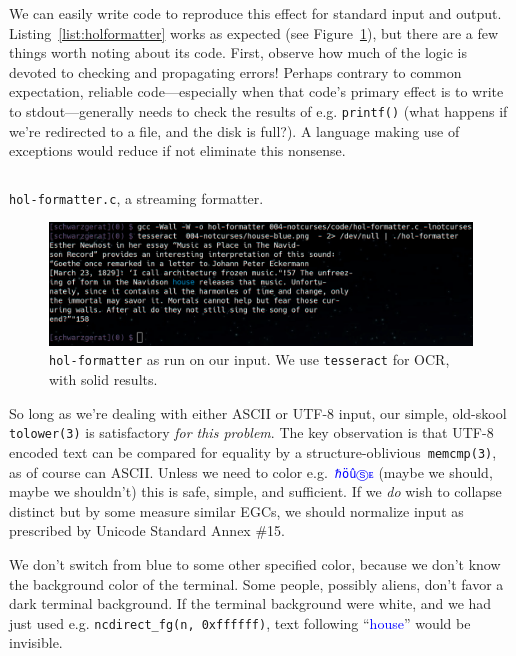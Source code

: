 \documentclass[letterpaper,10pt]{article}
\begin{document}
We can easily write code to reproduce this effect for standard input and output.
Listing~\ref{list:holformatter} works as expected (see
Figure~\ref{fig:houseout}), but there are a few things worth noting about its
code. First, observe how much of the logic is devoted to checking and
propagating errors! Perhaps contrary to common expectation, reliable
code---especially when that code's primary effect is to write to
stdout---generally needs to check the results of e.g. \texttt{printf()} (what
happens if we're redirected to a file, and the disk is full?). A language
making use of exceptions would reduce if not eliminate this nonsense.

\begin{listing}[!htbp]
\inputminted[]{C}{code/hol-formatter.c}
\caption{\texttt{hol-formatter.c}, a streaming formatter.}
\label{list:holformatter}
\end{listing}

\begin{figure}[!htbp]
\centering \includegraphics[width=.75\linewidth]{hol-formatted.png}
\caption[\texttt{hol-formatter} as run on OCRd input.]{\texttt{hol-formatter} as run on our input. We use \texttt{tesseract} for OCR, with solid results.}
\label{fig:houseout}
\end{figure}

So long as we're dealing with either ASCII or UTF-8 input, our simple, old-skool
\texttt{tolower(3)} is satisfactory \textit{for this problem}. The key
observation is that UTF-8 encoded text can be compared for equality by
a structure-oblivious~\texttt{memcmp(3)}, as of course can ASCII.
Unless we need to color e.g.~\textcolor{blue}{\texttt{ℏöûⓈᴇ}} (maybe we should,
maybe we shouldn't) this is safe, simple, and sufficient. If we \textit{do}
wish to collapse distinct but by some measure similar EGCs, we should normalize
input as prescribed by Unicode Standard Annex \#15\cite{annex15}.

We don't switch from blue to some other specified color, because we don't know
the background color of the terminal. Some people, possibly aliens, don't favor
a dark terminal background. If the terminal background were white, and we had
just used e.g. \texttt{ncdirect\_fg(n, 0xffffff)}, text following
``\textcolor{blue}{house}'' would be invisible.
\end{document}
